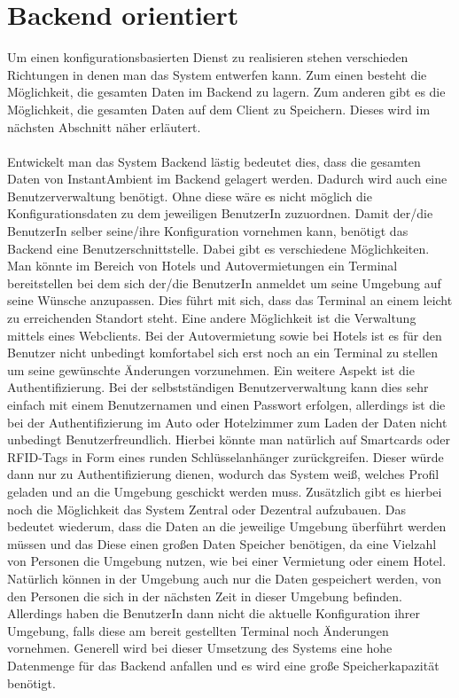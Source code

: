 \section{Backend orientiert}
Um einen konfigurationsbasierten Dienst zu realisieren stehen verschieden Richtungen in denen man das System entwerfen kann. 
Zum einen besteht die Möglichkeit, die gesamten Daten im Backend zu lagern. Zum anderen gibt es die Möglichkeit, die gesamten Daten auf dem Client zu Speichern. Dieses wird im nächsten Abschnitt näher erläutert.
\\\\
Entwickelt man das System Backend lästig bedeutet dies, dass die gesamten Daten von InstantAmbient im Backend gelagert werden. 
Dadurch wird auch eine Benutzerverwaltung benötigt. Ohne diese wäre es nicht möglich die Konfigurationsdaten zu dem jeweiligen BenutzerIn zuzuordnen. Damit der/die BenutzerIn selber seine/ihre Konfiguration vornehmen kann, benötigt das Backend eine Benutzerschnittstelle. Dabei gibt es verschiedene Möglichkeiten. Man könnte im Bereich von Hotels und Autovermietungen ein Terminal bereitstellen bei dem sich der/die BenutzerIn anmeldet um seine Umgebung auf seine Wünsche anzupassen. Dies führt mit sich, dass das Terminal an einem leicht zu erreichenden Standort steht. Eine andere Möglichkeit ist die Verwaltung mittels eines Webclients. Bei der Autovermietung sowie bei Hotels ist es für den Benutzer nicht unbedingt komfortabel sich erst noch an ein Terminal zu stellen um seine gewünschte Änderungen vorzunehmen. 
Ein weitere Aspekt ist die Authentifizierung. Bei der selbstständigen Benutzerverwaltung kann dies sehr einfach mit einem Benutzernamen und einen Passwort erfolgen, allerdings ist die bei der Authentifizierung im Auto oder Hotelzimmer zum Laden der Daten nicht unbedingt Benutzerfreundlich. Hierbei könnte man natürlich auf Smartcards oder RFID-Tags in Form eines runden Schlüsselanhänger zurückgreifen. Dieser würde dann nur zu Authentifizierung dienen, wodurch das System weiß, welches Profil geladen und an die Umgebung geschickt werden muss. Zusätzlich gibt es hierbei noch die Möglichkeit das System Zentral oder Dezentral aufzubauen. Das bedeutet wiederum, dass die Daten an die jeweilige Umgebung überführt werden müssen und das Diese einen großen Daten Speicher benötigen, da eine Vielzahl von Personen die Umgebung nutzen, wie bei einer Vermietung oder einem Hotel. Natürlich können in der Umgebung auch nur die Daten gespeichert werden, von den Personen die sich in der nächsten Zeit in dieser Umgebung befinden. Allerdings haben die BenutzerIn dann nicht die aktuelle Konfiguration ihrer Umgebung, falls diese am bereit gestellten Terminal noch Änderungen vornehmen.  
Generell wird bei dieser Umsetzung des Systems eine hohe Datenmenge für das Backend anfallen und es wird eine große Speicherkapazität benötigt.

